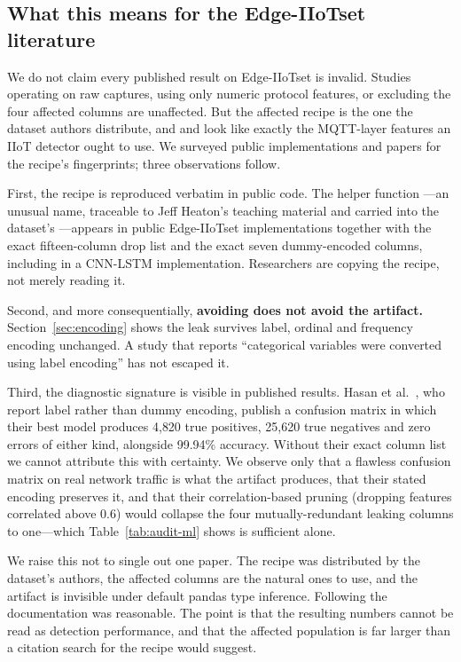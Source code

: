 \subsection{What this means for the Edge-IIoTset literature}

We do not claim every published result on Edge-IIoTset is invalid. Studies
operating on raw captures, using only numeric protocol features, or excluding
the four affected columns are unaffected. But the affected recipe is the one
the dataset authors distribute, and  and 
look like exactly the MQTT-layer features an IIoT detector ought to use. We
surveyed public implementations and papers for the recipe's fingerprints; three
observations follow.

First, the recipe is reproduced verbatim in public code. The helper function
---an unusual name, traceable to Jeff Heaton's
teaching material and carried into the dataset's ---appears in
public Edge-IIoTset implementations together with the exact fifteen-column drop
list and the exact seven dummy-encoded columns, including in a CNN-LSTM
implementation. Researchers are copying the recipe, not merely reading it.

Second, and more consequentially, \textbf{avoiding  does not
avoid the artifact.} Section~\ref{sec:encoding} shows the leak survives label,
ordinal and frequency encoding unchanged. A study that reports ``categorical
variables were converted using label encoding'' has not escaped it.

Third, the diagnostic signature is visible in published results. Hasan et
al.~\cite{hasan2025autoencoder}, who report label rather than dummy encoding,
publish a confusion matrix in which their best model produces 4{,}820 true
positives, 25{,}620 true negatives and zero errors of either kind, alongside
99.94\% accuracy. Without their exact column list we cannot attribute this with
certainty. We observe only that a flawless confusion matrix on real network
traffic is what the artifact produces, that their stated encoding preserves it,
and that their correlation-based pruning (dropping features correlated above
0.6) would collapse the four mutually-redundant leaking columns to
one---which Table~\ref{tab:audit-ml} shows is sufficient alone.

We raise this not to single out one paper. The recipe was distributed by the
dataset's authors, the affected columns are the natural ones to use, and the
artifact is invisible under default pandas type inference. Following the
documentation was reasonable. The point is that the resulting numbers cannot be
read as detection performance, and that the affected population is far larger
than a citation search for the recipe would suggest.

